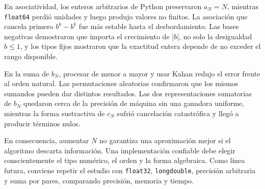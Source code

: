 \documentclass[11pt,a4paper]{article}
\newcommand{\codigo}[1]{\texttt{#1}}
\begin{document}
En asociatividad, los enteros arbitrarios de Python preservaron $a_N=N$, mientras \codigo{float64} perdió unidades y luego produjo valores no finitos. La asociación que cancela primero $b^k-b^k$ fue más estable hasta el desbordamiento. Las bases negativas demostraron que importa el crecimiento de $|b|$, no solo la desigualdad $b\le1$, y los tipos fijos mostraron que la exactitud entera depende de no exceder el rango disponible.

En la suma de $b_N$, procesar de menor a mayor y usar Kahan redujo el error frente al orden natural. Las permutaciones aleatorias confirmaron que los mismos sumandos pueden dar distintos resultados. Las dos representaciones sumatorias de $b_N$ quedaron cerca de la precisión de máquina sin una ganadora uniforme, mientras la forma sustractiva de $c_N$ sufrió cancelación catastrófica y llegó a producir términos nulos.

En consecuencia, aumentar $N$ no garantiza una aproximación mejor si el algoritmo descarta información. Una implementación confiable debe elegir conscientemente el tipo numérico, el orden y la forma algebraica. Como línea futura, conviene repetir el estudio con \codigo{float32}, \codigo{longdouble}, precisión arbitraria y suma por pares, comparando precisión, memoria y tiempo.

\clearpage

\begingroup
\raggedright

\endgroup
\end{document}
